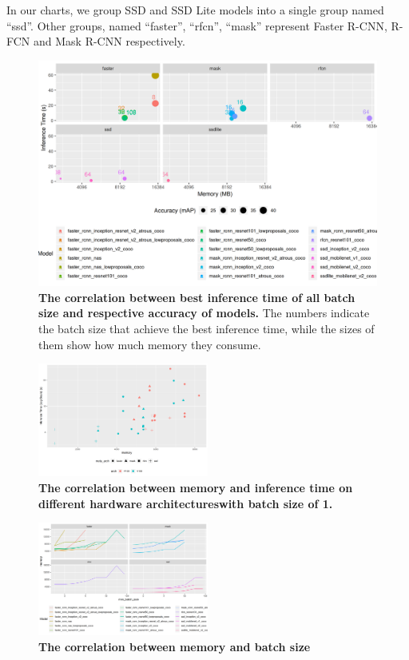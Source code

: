 \documentclass[conference]{IEEEtran}
\begin{document}
In our charts, we group SSD and SSD Lite models into a single group named ``ssd''. Other groups, named ``faster'', ``rfcn'', ``mask'' represent Faster R-CNN, R-FCN and Mask R-CNN respectively.

\begin{figure}[htpb]
	  \centering
	  \includegraphics[width=\textwidth]{TimeVSAccuracy}
	  \caption{\textbf{The correlation between best inference time of all batch size and respective accuracy of models.} The numbers indicate the batch size that achieve the best inference time, while the sizes of them show how much memory they consume.}
	  \label{fig:time-accuracy}
\end{figure}

\begin{figure}[htpb]
	  \centering
	  \includegraphics[width=0.5\textwidth]{MemoryVSRunning-DiffArch-Batch1}
	  \caption{\textbf{The correlation between memory and inference time on different hardware architectureswith batch size of 1.}
          }
	  \label{fig:memory-running-diff-arch}
\end{figure}

\begin{figure}[htpb]
	  \centering
	  \includegraphics[width=0.5\textwidth]{MemoryVSBatch}
	  \caption{\textbf{The correlation between memory and batch size}}
	  \label{fig:memory-batch}
\end{figure}
\end{document}
